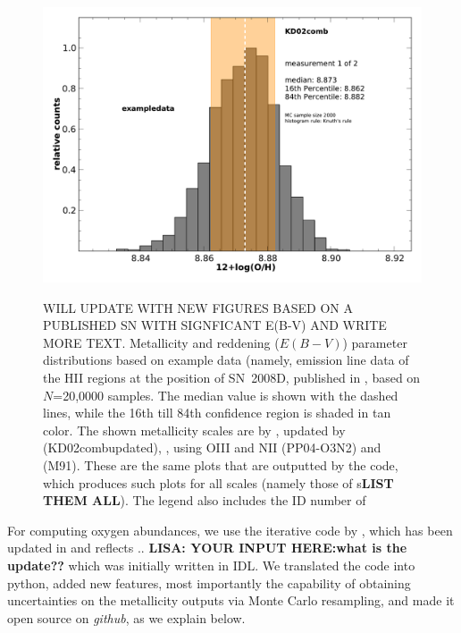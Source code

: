 \documentclass{emulateapj}
\begin{document}
\begin{figure}[!HT]
\begin{center}
{\includegraphics[width=0.95\columnwidth]{exampledata_n2000_KD02comb_1.pdf}}



\caption{WILL UPDATE WITH NEW FIGURES BASED ON A PUBLISHED SN WITH SIGNFICANT E(B-V) AND WRITE MORE TEXT. Metallicity and reddening ($E(B-V)$) parameter distributions based on example data (namely, emission line data of the HII regions at the position of SN~2008D, published in \citet{modjaz11}, based on $N$=20,0000 samples. The median value is shown with the dashed lines, while the 16th till 84th confidence region is shaded in tan color. The shown metallicity scales are  by \citet{kewley02}, updated by \citet{kewley08} (KD02combupdated), \citet{pettini04}, using OIII and NII  (PP04-O3N2) and \citet{mcgaugh91} (M91). These are the same plots that are outputted by the code, which produces such plots for all scales (namely those of s\textbf{LIST THEM ALL}). The legend also includes the ID number of }
 \label{metallicity_distribution}
\end{center}
\vspace{-0.5in}
\end{figure}


For computing oxygen abundances, we use the iterative code by \citet{kewley02}, which has been updated in \citet{kewley08} and reflects .. \textbf{LISA: YOUR INPUT HERE:what is the update??} which was initially written in IDL.  We translated the code into python, added new features, most importantly the capability of obtaining uncertainties on the metallicity outputs via Monte Carlo resampling, and made it open source on \emph{github}, as we explain below.
\end{document}
